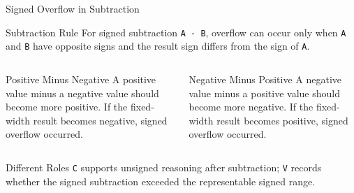 \documentclass[aspectratio=169,11pt,t]{beamer}
\newcommand{\code}[1]{\texttt{#1}}
\begin{document}
\begin{frame}{Signed Overflow in Subtraction}
\begin{block}{Subtraction Rule}
For signed subtraction \code{A - B}, overflow can occur only when \code{A} and \code{B} have opposite signs and the result sign differs from the sign of \code{A}.
\end{block}
\vspace{0.18cm}
\begin{columns}[T,onlytextwidth]
\begin{block}{Positive Minus Negative}
A positive value minus a negative value should become more positive. If the fixed-width result becomes negative, signed overflow occurred.
\end{block}
\begin{block}{Negative Minus Positive}
A negative value minus a positive value should become more negative. If the fixed-width result becomes positive, signed overflow occurred.
\end{block}
\end{columns}
\vspace{0.2cm}
\begin{block}{Different Roles}
\code{C} supports unsigned reasoning after subtraction; \code{V} records whether the signed subtraction exceeded the representable signed range.
\end{block}
\end{frame}










\end{document}
